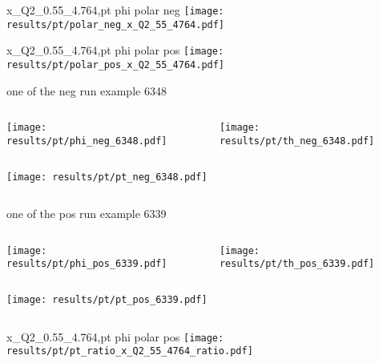 \begin{frame}{x\_Q2\_0.55\_4.764,pt phi polar neg}
\texttt{[image: results/pt/polar\_neg\_x\_Q2\_55\_4764.pdf]}
\end{frame}
\begin{frame}{x\_Q2\_0.55\_4.764,pt phi polar pos}
\texttt{[image: results/pt/polar\_pos\_x\_Q2\_55\_4764.pdf]}
\end{frame}
\begin{frame}{one of the neg run example 6348}
\begin{columns}
\begin{column}[T]{0.5\textwidth}
\texttt{[image: results/pt/phi\_neg\_6348.pdf]}
\end{column}
\begin{column}[T]{0.5\textwidth}
\texttt{[image: results/pt/th\_neg\_6348.pdf]}
\end{column}
\end{columns}
\begin{columns}
\begin{column}[T]{0.5\textwidth}
\texttt{[image: results/pt/pt\_neg\_6348.pdf]}
\end{column}
\begin{column}[T]{0.5\textwidth}
\end{column}
\end{columns}
\end{frame}
\begin{frame}{one of the pos run example 6339}
\begin{columns}
\begin{column}[T]{0.5\textwidth}
\texttt{[image: results/pt/phi\_pos\_6339.pdf]}
\end{column}
\begin{column}[T]{0.5\textwidth}
\texttt{[image: results/pt/th\_pos\_6339.pdf]}
\end{column}
\end{columns}
\begin{columns}
\begin{column}[T]{0.5\textwidth}
\texttt{[image: results/pt/pt\_pos\_6339.pdf]}
\end{column}
\begin{column}[T]{0.5\textwidth}
\end{column}
\end{columns}
\end{frame}
\begin{frame}{x\_Q2\_0.55\_4.764,pt phi polar pos}
\texttt{[image: results/pt/pt\_ratio\_x\_Q2\_55\_4764\_ratio.pdf]}
\end{frame}
